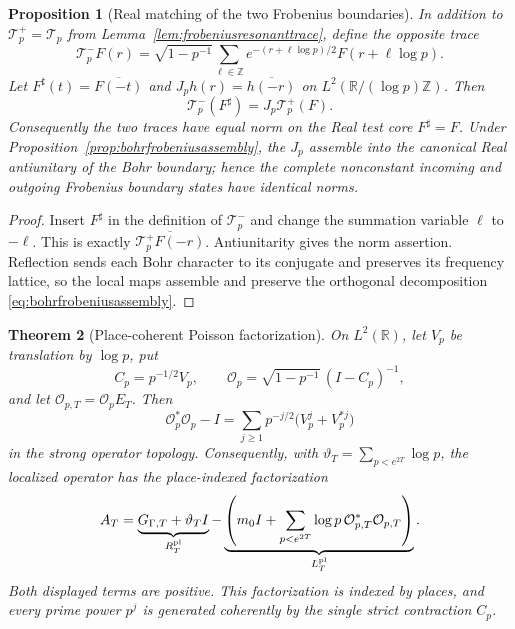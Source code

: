 \documentclass[11pt]{amsart}
\newtheorem{theorem}{Theorem}[section]
\newtheorem{proposition}[theorem]{Proposition}
\theoremstyle{definition}
\theoremstyle{remark}
\begin{document}
\begin{proposition}[Real matching of the two Frobenius boundaries]
\label{prop:realfrobeniusboundary}
In addition to $\mathcal T_p^+=\mathcal T_p$ from
Lemma~\ref{lem:frobeniusresonanttrace}, define the opposite trace
\[
 \mathcal T_p^-F(r)=\sqrt{1-p^{-1}}
   \sum_{\ell\in\mathbb Z}e^{-(r+\ell\log p)/2}
       F(r+\ell\log p).
\]
Let $F^\sharp(t)=\overline{F(-t)}$ and
$J_ph(r)=\overline{h(-r)}$ on
$L^2(\mathbb R/(\log p)\mathbb Z)$.  Then
\begin{equation}\label{eq:realfrobeniusboundary}
 \mathcal T_p^-(F^\sharp)=J_p\mathcal T_p^+(F).
\end{equation}
Consequently the two traces have equal norm on the Real test core
$F^\sharp=F$.  Under Proposition~\ref{prop:bohrfrobeniusassembly}, the
$J_p$ assemble into the canonical Real antiunitary of the Bohr boundary;
hence the complete nonconstant incoming and outgoing Frobenius boundary
states have identical norms.
\end{proposition}

\begin{proof}
Insert $F^\sharp$ in the definition of $\mathcal T_p^-$ and change the
summation variable $\ell$ to $-\ell$.  This is exactly
$\overline{\mathcal T_p^+F(-r)}$.  Antiunitarity gives the norm assertion.
Reflection sends each Bohr character to its conjugate and preserves its
frequency lattice, so the local maps assemble and preserve the orthogonal
decomposition \eqref{eq:bohrfrobeniusassembly}.
\end{proof}

\begin{theorem}[Place-coherent Poisson factorization]
\label{thm:placepoissonfactorization}
On $L^2(\mathbb R)$, let $V_p$ be translation by \(\log p\), put
\[
 C_p=p^{-1/2}V_p,
 \qquad
 \mathcal O_p=\sqrt{1-p^{-1}}\,(I-C_p)^{-1},
\]
and let \(\mathcal O_{p,T}=\mathcal O_pE_T\).  Then
\begin{equation}\label{eq:placepoissonkernel}
 \mathcal O_p^*\mathcal O_p-I
 =\sum_{j\ge1}p^{-j/2}
       \bigl(V_p^j+V_p^{*j}\bigr)
\end{equation}
in the strong operator topology.  Consequently, with
\(\vartheta_T=\sum_{p<e^{2T}}\log p\), the localized operator has the
place-indexed factorization
\begin{equation}\label{eq:placepoissonfactorization}
 A_T=\underbrace{G_{\Gamma,T}+\vartheta_TI}_{R_T^{\rm pl}}
 -\underbrace{\left(m_0I+
   \sum_{p<e^{2T}}\log p\,
     \mathcal O_{p,T}^*\mathcal O_{p,T}\right)}_{L_T^{\rm pl}}.
\end{equation}
Both displayed terms are positive.  This factorization is indexed by places,
and every prime power $p^j$ is generated coherently by the single strict
contraction $C_p$.
\end{theorem}
\end{document}
